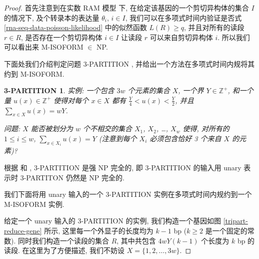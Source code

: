 \begin{proof}

首先注意到在实数 RAM 模型 \cite{Preparata:1985:CGI:4333} 下, 
在给定该基因的一个剪切异构体的集合 $I$ 的情况下, 及个转录本的表达量 $\theta_i$, $i\in I$, 
我们可以在多项式时间内验证是否式 \eqref{rna-seq-data-poisson-likelihood} 中的似然函数 $L(R) \geq q$, 
并且对所有的读段 $r\in R$, 
是否存在一个剪切异构体 $i\in I$ 让读段 $r$ 可以来自剪切异构体 $i$. 
所以我们可以看出来 M-ISOFORM $\in$ NP. 

下面处我们介绍判定问题 3-PARTITION \cite{doi:10.1137/0204035, Garey:1990:CIG:574848}, 
并给出一个方法在多项式时间内规将其约到 M-ISOFORM. 

\newtheorem*{tripart}{3-PARTITION}

\begin{tripart}
\hspace*{1mm}

实例: 一个包含 $3w$ 个元素的集合 $X$, 一个界 $Y \in \mathbb{Z}^+$, 
和一个量 $u(x) \in \mathbb{Z}^+$ 使得对每个 $x \in X$ 
都有 $\frac{Y}{4} < u(x) < \frac{Y}{2}$, 
并且 $\sum_{x \in X} u(x) = w Y$.

问题: $X$ 能否被划分为 $w$ 个不相交的集合 $X_1$, $X_2$, \ldots, $X_w$ 使得, 
对所有的 $1 \leq i \leq w$, $\sum_{x \in X_i} u(x) = Y$ 
(注意到每个 $X_i$ 必须包含恰好 3 个来自 $X$ 的元素)?
\end{tripart}

根据  和 , 
3-PARTITION 是强 NP 完全的, 
即 3-PARTITION 的输入用 unary 表示时 3-PARTITON 仍然是 NP 完全的. 

我们下面将用 unary 输入的一个 3-PARTITION 实例在多项式时间内规约到一个 M-ISOFORM 实例. 

给定一个 unary 输入的 3-PARTITION 的实例, 
我们构造一个基因如图 \ref{tripart-reduce-gene} 所示, 
这里每一个外显子的长度均为 $k-1$ bp ($k\geq 2$ 是一个固定的常数). 
同时我们构造一个读段的集合 $R$, 
其中共包含 $4wY(k-1)$ 个长度为 $k$ bp 的读段. 
在这里为了方便描述, 我们不妨设 $X=\{1,2,\ldots,3w\}$. 


\end{proof}
